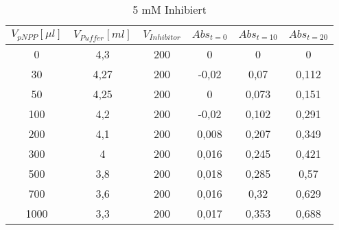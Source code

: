 \begin{table}[H]
    \centering
    \caption{5 mM Inhibiert}
      \begin{tabular}{cccccc}
      \midrule
      $V_{pNPP} [\mu l]$ & $V_{Puffer} [ml]$ & $V_{Inhibitor}$ &$Abs_{t=0}$ & $Abs_{t=10}$ & $Abs_{t=20}$\\
      \midrule
     0     & 4,3   & 200   & 0     & 0     & 0 \\
    30    & 4,27  & 200   & -0,02 & 0,07  & 0,112 \\
    50    & 4,25  & 200   & 0     & 0,073 & 0,151 \\
    100   & 4,2   & 200   & -0,02 & 0,102 & 0,291 \\
    200   & 4,1   & 200   & 0,008 & 0,207 & 0,349 \\
    300   & 4     & 200   & 0,016 & 0,245 & 0,421 \\
    500   & 3,8   & 200   & 0,018 & 0,285 & 0,57 \\
    700   & 3,6   & 200   & 0,016 & 0,32  & 0,629 \\
    1000  & 3,3   & 200   & 0,017 & 0,353 & 0,688 \\
      \bottomrule
      \end{tabular}%
    \label{tab:addlabel}%
  \end{table}%
   